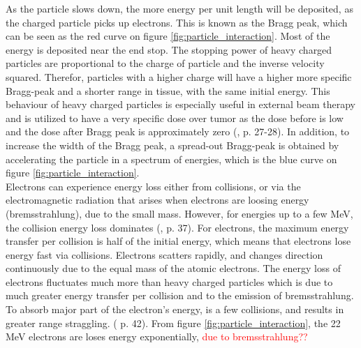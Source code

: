  As the particle slows down, the more energy per unit length will be deposited, as the charged particle picks up electrons. This is known as the Bragg peak, which can be seen as the red curve on figure \ref{fig:particle_interaction}. Most of the energy is deposited near the end stop. The stopping power of heavy charged particles are proportional to the charge of particle and the inverse velocity squared. Therefor, particles with a higher charge will have a higher more specific Bragg-peak and a shorter range in tissue, with the same initial energy. This behaviour of heavy charged particles is especially useful in external beam therapy and is utilized to have a very specific dose over tumor as the dose before is low and the dose after Bragg peak is approximately zero (\cite{Leo1994}, p. 27-28). In addition, to increase the width of the Bragg peak, a spread-out Bragg-peak is obtained by accelerating the particle in a spectrum of energies, which is the blue curve on figure \ref{fig:particle_interaction}.  \\

Electrons can experience energy loss either from  collisions, or via the electromagnetic radiation that arises when electrons are loosing energy (bremsstrahlung), due to the small mass. However, for energies up to a few MeV, the collision energy loss dominates (\cite{Leo1994}, p. 37). For electrons, the maximum energy transfer per collision is half of the initial energy, which means that electrons lose energy fast via collisions. Electrons scatters rapidly, and changes direction continuously due to the equal mass of the atomic electrons. The energy loss of electrons fluctuates much more than heavy charged particles which is due to much greater energy transfer per collision and to the emission of bremsstrahlung. To absorb major part of the electron's energy, is a few collisions, and results in greater range straggling.  (\cite{Leo1994} p. 42). From figure \ref{fig:particle_interaction}, the 22 MeV electrons are loses energy exponentially, \textcolor{red}{due to bremsstrahlung??}\\ 
 

